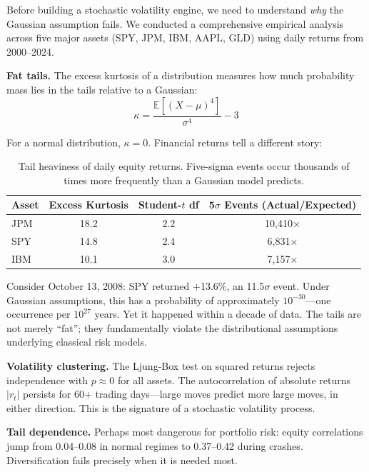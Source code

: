 \documentclass[11pt,a4paper]{article}
\begin{document}
Before building a stochastic volatility engine, we need to understand \emph{why} the Gaussian assumption fails. We conducted a comprehensive empirical analysis across five major assets (SPY, JPM, IBM, AAPL, GLD) using daily returns from 2000--2024.

\textbf{Fat tails.} The excess kurtosis of a distribution measures how much probability mass lies in the tails relative to a Gaussian:
\begin{equation}
\kappa = \frac{\mathbb{E}[(X - \mu)^4]}{\sigma^4} - 3
\end{equation}

For a normal distribution, $\kappa = 0$. Financial returns tell a different story:

\begin{table}[H]
\centering
\begin{tabular}{lccc}
\toprule
\textbf{Asset} & \textbf{Excess Kurtosis} & \textbf{Student-$t$ df} & \textbf{5$\sigma$ Events (Actual/Expected)} \\
\midrule
JPM & 18.2 & 2.2 & 10{,}410$\times$ \\
SPY & 14.8 & 2.4 & 6{,}831$\times$ \\
IBM & 10.1 & 3.0 & 7{,}157$\times$ \\
\bottomrule
\end{tabular}
\caption{Tail heaviness of daily equity returns. Five-sigma events occur thousands of times more frequently than a Gaussian model predicts.}
\label{tab:kurtosis}
\end{table}

Consider October 13, 2008: SPY returned $+$13.6\%, an 11.5$\sigma$ event. Under Gaussian assumptions, this has a probability of approximately $10^{-30}$---one occurrence per $10^{27}$ years. Yet it happened within a decade of data. The tails are not merely ``fat''; they fundamentally violate the distributional assumptions underlying classical risk models.

\textbf{Volatility clustering.} The Ljung-Box test on squared returns rejects independence with $p \approx 0$ for all assets. The autocorrelation of absolute returns $|r_t|$ persists for 60+ trading days---large moves predict more large moves, in either direction. This is the signature of a stochastic volatility process.

\textbf{Tail dependence.} Perhaps most dangerous for portfolio risk: equity correlations jump from 0.04--0.08 in normal regimes to 0.37--0.42 during crashes. Diversification fails precisely when it is needed most.
\end{document}
